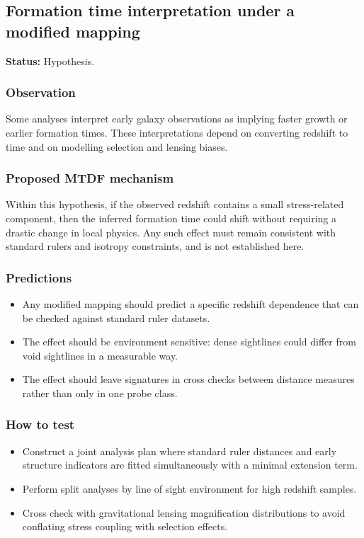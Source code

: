 \documentclass[11pt,a4paper]{article}
\begin{document}
\subsection{Formation time interpretation under a modified mapping}
\begin{mdframed}[linecolor=accent,linewidth=0.5pt,backgroundcolor=callout-bg,leftline=true,rightline=true,topline=true,bottomline=true,innerleftmargin=8pt,innerrightmargin=8pt,innertopmargin=6pt,innerbottommargin=6pt]
\textbf{Status:} Hypothesis.
\end{mdframed}

\subsubsection{Observation}
Some analyses interpret early galaxy observations as implying faster growth or earlier formation times. These interpretations depend on converting redshift to time and on modelling selection and lensing biases.

\subsubsection{Proposed MTDF mechanism}
Within this hypothesis, if the observed redshift contains a small stress-related component, then the inferred formation time could shift without requiring a drastic change in local physics. Any such effect must remain consistent with standard rulers and isotropy constraints, and is not established here.

\subsubsection{Predictions}
\begin{itemize}
  \item Any modified mapping should predict a specific redshift dependence that can be checked against standard ruler datasets.
  \item The effect should be environment sensitive: dense sightlines could differ from void sightlines in a measurable way.
  \item The effect should leave signatures in cross checks between distance measures rather than only in one probe class.
\end{itemize}

\subsubsection{How to test}
\begin{itemize}
  \item Construct a joint analysis plan where standard ruler distances and early structure indicators are fitted simultaneously with a minimal extension term.
  \item Perform split analyses by line of sight environment for high redshift samples.
  \item Cross check with gravitational lensing magnification distributions to avoid conflating stress coupling with selection effects.
\end{itemize}
\end{document}
